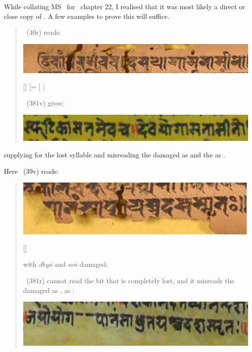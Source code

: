 While collating MS \msL\ for \VSS\ chapter 22, 
I realised that it was most likely a 
direct or close copy of \msNa. 
A few examples to prove this will suffice.

\begin{quote}
\msNa\ (\fol40r) reads: 

\includegraphics[scale=.3]{images/dasayoga_msNa.png}

[]\lk {} [= ] 
 $|$ 

\msL\ (\fol381v) gives:

\includegraphics[scale=.3]{images/dasayoga_msL.png}

\end{quote}

\noindent
supplying  for the lost syllable and misreading the 
damaged  as  and the  as .

Here \msNa\ (\fol39v) reads:

\begin{quote}
\includegraphics[scale=.5]{images/japoyoga_msNa.png}

[]  

with \textit{dhyā} and \textit{svā} damaged;

\msL\ (\fol381r) cannot read the bit that 
is completely lost, and it misreads 
the damaged  as ,  as :
\smallskip

\includegraphics[scale=.3]{images/japoyoga_msL.png}
\end{quote}

